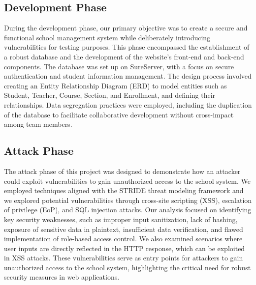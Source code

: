 \documentclass[letterpaper,twocolumn]{article}
\begin{document}
\subsection{Development Phase}
During the development phase, our primary objective was to create a secure and functional school management system while deliberately introducing vulnerabilities for testing purposes. This phase encompassed the establishment of a robust database and the development of the website’s front-end and back-end components. The database was set up on SureServer, with a focus on secure authentication and student information management. The design process involved creating an Entity Relationship Diagram (ERD) to model entities such as Student, Teacher, Course, Section, and Enrollment, and defining their relationships. Data segregation practices were employed, including the duplication of the database to facilitate collaborative development without cross-impact among team members.

\subsection{Attack Phase}
The attack phase of this project was designed to demonstrate how an attacker could exploit vulnerabilities to gain unauthorized access to the school system. We employed techniques aligned with the STRIDE threat modeling framework and we explored potential vulnerabilities through cross-site scripting (XSS), escalation of privilege (EoP), and SQL injection attacks.
Our analysis focused on identifying key security weaknesses, such as improper input sanitization, lack of hashing, exposure of sensitive data in plaintext, insufficient data verification, and flawed implementation of role-based access control. We also examined scenarios where user inputs are directly reflected in the HTTP response, which can be exploited in XSS attacks. These vulnerabilities serve as entry points for attackers to gain unauthorized access to the school system, highlighting the critical need for robust security measures in web applications.
\end{document}
